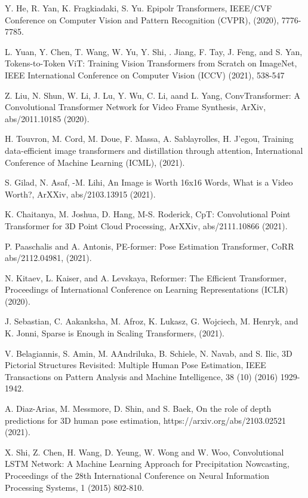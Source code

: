 \documentclass{article}
\begin{document}
\begin{thebibliography}{9}
 Y. He, R. Yan, K. Fragkiadaki, S. Yu. Epipolr Transformers, IEEE/CVF Conference on Computer Vision and Pattern Recognition (CVPR), (2020), 7776-7785.


 L. Yuan, Y. Chen, T. Wang, W. Yu, Y. Shi, . Jiang, F. Tay, J. Feng, and S. Yan, Tokens-to-Token ViT: Training Vision Transformers from Scratch on ImageNet, IEEE International Conference on Computer Vision (ICCV) (2021), 538-547

 Z. Liu, N. Shun, W. Li, J. Lu, Y. Wu, C. Li, aand L. Yang, ConvTransformer: A Convolutional Transformer Network for Video Frame Synthesis, ArXiv, abs/2011.10185 (2020).

 H. Touvron, M. Cord, M. Doue, F. Massa, A. Sablayrolles, H. J'egou, Training data-efficient image transformers and distillation through attention, International Conference of Machine Learning (ICML), (2021).

 S. Gilad, N. Asaf, -M. Lihi, An Image is Worth 16x16 Words, What is a Video Worth?, ArXXiv, abs/2103.13915 (2021).

 K. Chaitanya, M. Joshua, D. Hang, M-S. Roderick, CpT: Convolutional Point Transformer for 3D Point Cloud Processing, ArXXiv, abs/2111.10866 (2021).

 P. Paaschalis and A. Antonis, PE-former: Pose Estimation Transformer, CoRR abs/2112.04981, (2021).

 N. Kitaev, L. Kaiser, and A. Levskaya, Reformer: The Efficient Transformer, Proceedings of International Conference on Learning Representations (ICLR) (2020).

 J. Sebastian, C. Aakanksha, M. Afroz, K. Lukasz, G. Wojciech, M. Henryk, and K. Jonni, Sparse is Enough in Scaling Transformers, (2021).

 V. Belagiannis, S. Amin, M. AAndriluka, B. Schiele, N. Navab, and S. Ilic, 3D Pictorial Structures Revisited: Multiple Human Pose Estimation, IEEE Transactions on Pattern Analysis and Machine Intelligence, 38 (10) (2016) 1929-1942.

 A. Diaz-Arias, M. Messmore, D. Shin, and S. Baek, On the role of depth predictions for 3D human pose estimation, https://arxiv.org/abs/2103.02521 (2021).


 X. Shi, Z. Chen, H. Wang, D. Yeung, W. Wong and W. Woo, Convolutional LSTM Network: A Machine Learning Approach for Precipitation Nowcasting, Proceedings of the 28th International Conference on Neural Information Processing Systems, 1 (2015) 802-810.


\end{thebibliography}
\end{document}
